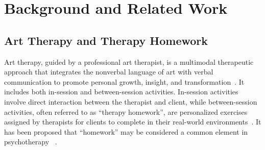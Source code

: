 \section{Background and Related Work} \label{sec:background}
\subsection{Art Therapy and Therapy Homework}
Art therapy, guided by a professional art therapist, is a multimodal therapeutic approach that integrates the nonverbal language of art with verbal communication to promote personal growth, insight, and transformation~\cite{malchiodi2007art}.
It includes both in-session and between-session activities. 
In-session activities involve direct interaction between the therapist and client, while between-session activities, often referred to as ``therapy homework'', are personalized exercises assigned by therapists for clients to complete in their real-world environments~\cite{kazantzis2007handbook}.
It has been proposed that ``homework'' may be considered a common element in psychotherapy ~\cite{kazantzis2007handbook}. 
